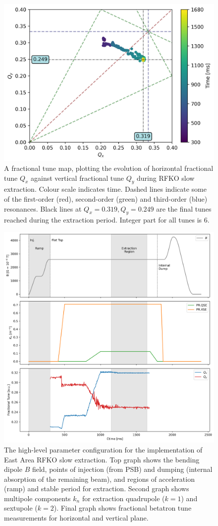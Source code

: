 \documentclass[a4paper,twoside,11pt]{report}
\begin{document}
\begin{figure}
  \centering
  \includegraphics[width=0.6\linewidth]{tunemap.png}
  \caption[Fractional tune map during RFKO slow extraction]{A fractional tune map, plotting the evolution of horizontal fractional tune $Q_x$ against vertical fractional tune $Q_y$ during RFKO slow extraction. Colour scale indicates time. Dashed lines indicate some of the first-order (red), second-order (green) and third-order (blue) resonances. Black lines at $Q_x=0.319, Q_y=0.249$ are the final tunes reached during the extraction period. Integer part for all tunes is 6.}\label{fig:tunemap}
\end{figure}

\begin{figure}[h]
  \centering
  \includegraphics[width=0.9\linewidth]{cyclegraphs.png}
  \caption[High-level parameter graphs and tune measurements during RFKO slow extraction]{The high-level parameter configuration for the implementation of East Area RFKO slow extraction. Top graph shows the bending dipole $B$ field, points of injection (from PSB) and dumping (internal absorption of the remaining beam), and regions of acceleration (ramp) and stable period for extraction. Second graph shows multipole components $k_n$ for extraction quadrupole ($k=1$) and sextupole ($k=2$). Final graph shows fractional betatron tune measurements for horizontal and vertical plane.}\label{fig:cycle}
\end{figure}
\end{document}
